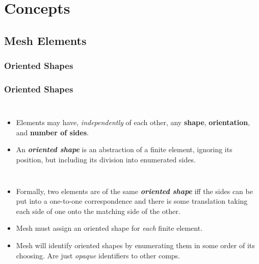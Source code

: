\documentclass[compress]{beamer}
\begin{document}
\section{Concepts}

\subsection{Mesh Elements}

\subsubsection{Oriented Shapes}

\begin{frame}
  \frametitle{Oriented Shapes}
  \begin{columns}
      \pause
      \begin{itemize}[<+->]
        \item Elements may have, \emph{independently} of each other, any \textbf{shape}, \textbf{orientation}, and \textbf{number of sides}.
        \item An \textbf{\emph{oriented shape}} is an abstraction of a finite element, ignoring its position, but including its division into
          enumerated sides.
      \end{itemize}
  \end{columns}
  
  \begin{itemize}[<+->]
    \item Formally, two elements are of the same \textbf{\emph{oriented shape}} iff the sides can be put into a one-to-one correspondence and
       there is some translation taking each side of one onto the matching side of the other.
    \item Mesh must assign an oriented shape for \emph{each} finite element. 
    \item Mesh will identify oriented shapes by enumerating them in some order of its choosing. Are just \emph{opaque} identifiers to other comps.
  \end{itemize}
\end{frame}
\end{document}
